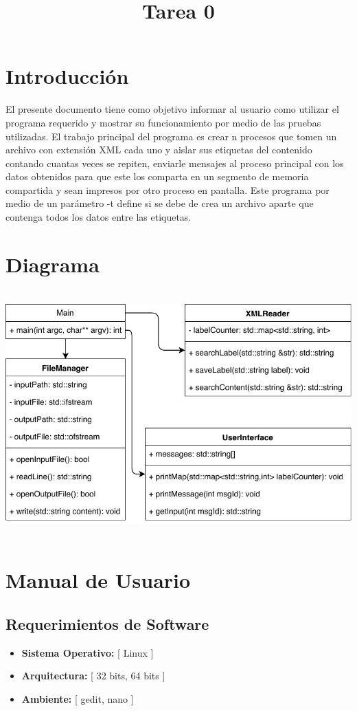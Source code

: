 \title{Tarea 0}



\section{Introducción}
El presente documento tiene como objetivo informar al usuario como utilizar el programa requerido y mostrar su funcionamiento por medio de las pruebas utilizadas. El trabajo principal del programa es crear n procesos que tomen un archivo con extensión XML cada uno y aislar sus etiquetas del contenido contando cuantas veces se repiten, enviarle mensajes al proceso principal con los datos obtenidos para que este los comparta en un segmento de memoria compartida y sean impresos por otro proceso en pantalla. Este programa por medio de un parámetro -t define si se debe de crea un archivo aparte que contenga todos los datos entre las etiquetas. 

\section{Diagrama}
	\ \hfill \includegraphics[scale = 0.8]{pictures/Diagrama.pdf} \hfill \ 
\section{Manual de Usuario}
\subsection{Requerimientos de Software}
	\begin{itemize}
    \item	\textbf{Sistema Operativo:} [ Linux ]
    \item	\textbf{Arquitectura:} [ 32 bits, 64 bits ]
    \item	\textbf{Ambiente:} [ gedit, nano ]
    \end{itemize}
